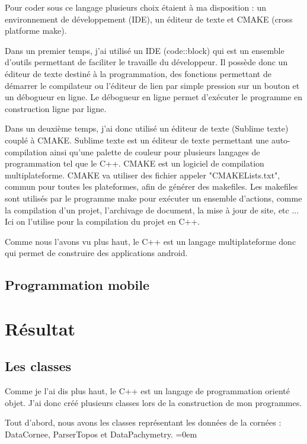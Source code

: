 \documentclass[a4paper,12pt]{article}
\begin{document}
  Pour coder sous ce langage plusieurs choix étaient à ma disposition : un environnement de développement (IDE), un éditeur de texte et CMAKE (cross platforme make). 
  
  Dans un premier temps, j'ai utilisé un IDE (code::block) qui est un ensemble d'outils permettant de faciliter le travaille du développeur. Il possède donc un éditeur de texte destiné à la programmation, des fonctions permettant de démarrer le compilateur ou l'éditeur de lien par simple pression sur un bouton et un débogueur en ligne. Le débogueur en ligne permet d'exécuter le programme en construction ligne par ligne. 
  
  Dans un deuxième temps, j'ai donc utilisé un éditeur de texte (Sublime texte) couplé à CMAKE. Sublime texte est un éditeur de texte permettant une auto-compilation ainsi qu'une palette de couleur pour plusieurs langages de programmation tel que le C++. CMAKE est un logiciel de compilation multiplateforme. CMAKE va utiliser des fichier appeler "CMAKELists.txt", commun pour toutes les plateformes, afin de générer des makefiles. Les makefiles sont utilisés par le programme make pour exécuter un ensemble d'actions, comme la compilation d'un projet, l'archivage de document, la mise à jour de site, etc ... Ici on l'utilise pour la compilation du projet en C++.
  
   \vspace{0.25cm}
Comme nous l'avons vu plus haut, le C++ est un langage multiplateforme donc qui permet de construire des applications android.
	\subsection{Programmation mobile}

\newpage
\section{Résultat}
	\subsection{Les classes}
Comme je l'ai dis plus haut, le C++ est un langage de programmation orienté objet. J'ai donc créé plusieurs classes lors de la construction de mon programmes.  

\vspace{0.25cm}
Tout d'abord, nous avons les classes représentant les données de la cornées : DataCornee, ParserTopos et DataPachymetry.
\parindent=0em
\end{document}

